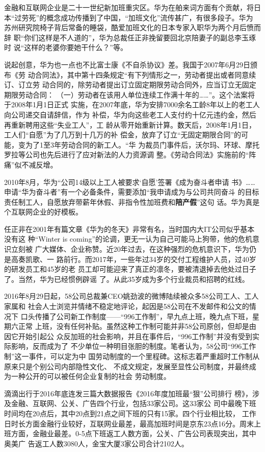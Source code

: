 金融和互联网企业是二十一世纪新加班重灾区。华为在舶来词方面有个贡献，将日
本“过劳死”的概念成功传播到了中国，“加班文化”流传甚广，有很多段子。华为
苏州研究院椅子背后常备的睡袋，酷爱加班文化的日本专家入职华为两个月后愤而辞
职“你们这样是不人道的”，华为总裁任正非挽留要回北京陪妻子的副总李玉琢时
说“这样的老婆你要她干什么？”等。

说起创意，华为也一点也不比富士康《不自杀协议》差。我国于2007年6月29日颁布《劳
动合同法》，其中第十四条规定“有下列情形之一，劳动者提出或者同意续订、订立劳
动合同的，除劳动者提出订立固定期限劳动合同外，应当订立无固定期限劳动合同：
（一）劳动者在该用人单位连续工作满十年的……”。这个法案将于2008年1月1日正式
实施，在2007年底，华为安排7000余名工龄8年以上的老工人向公司递交自请辞信，作为
补偿，华为向这些老工人支付约十亿元违约金，然后再重新聘用这些“失业工人”，工
龄从零开始重新计算。数天后，2008年1月1日，工人们“自愿”为了几万到十几万的补
偿金，放弃了订立“无固定期限合同”的可能，变为了1至3年劳动合同的新工人。“华
为裁员门事件后，沃尔玛、环球、摩托罗拉等公司也先后进行了应对新法的人力资源调
整。《劳动合同法》实施前的“阵痛”似不减反增。\cite{huaweimaiduan}

2010年8月，华为“公司14级以上工人被要求`自愿'签署《成为奋斗者申请
书》……申请“华为奋斗者”有一个必备条件，需要添加“我申请成为与公司共同奋斗
的目标责任制工人，自愿放弃带薪年休假、非指令性加班费和\textbf{陪产假}”这句
话。\cite{huaweifendou}华为真是个互联网企业的好模板。

任正非在2001年有篇文章《华为的冬天》非常有名，当时国内大IT公司似乎基本没有这
种“Winter is coming”的论调，更无一认为自己可能马上狗带，他的危机意识立刻被
广大媒体、企业称赞。近20年过去，在这种强烈的危机意识下，华为仍是高奏凯歌、一
路前行。而2017年，一些年过34岁的交付工程维护人员，过40岁的研发员工和45岁的老
员工却可能迎来了真正的凛冬，要被清退掉去他处过日子了。当然，华为已经惯例辟谣
了。从此35岁成为多个行业裁员和招聘的红线。

2016年8月29日起，58公司总裁兼CEO姚劲波的微博陆续被众多58公司工人、工人家属和
社会人士浏览并情绪不稳定地评论\cite{tai58}，起因是58公司在不发邮件和公文的情况下
口头传播了公司新工作制度——“996工作制”，早九点上班，晚九点下班，星期六正常
上班，没有任何补贴。虽然这种工作制可能并非58公司原创，但却是由因它开始引起公
众反加班的社会影响，并且在事件后，“996工作制”并没有受到实际影响，反而成为了
不少单位一种明目张胆的制度。笔者认为，58公司“996工作制”这一事件，可以定为中
国劳动制度的一个里程碑。这标志着严重超时工作制从原来只是个别公司内部隐性文化、
不成文规定，发展至显性公司制度，并最终成为一种公开的可以被任何企业复制的社会
劳动制度。

滴滴出行于2016年底连发三篇大数据报告《2016年度加班最“狠”公司排行
榜》\cite{zuihen}，涉及金融、互联网、公关、广告四个行业，包括33家公司。这33家公
司中最晚下班时间均在20点后，其中20点到21点之间下班的只有15家。四个行业相比较，
工作日时长方面金融行业较好，互联网业最差，最高加班时间是京东23点16分。周末上
班方面，金融业最差。0-5点下班返工人数方面，公关、广告公司表现突出，其中奥美广
告返工人数3080人，金宝大厦3家公司合计2102人。

